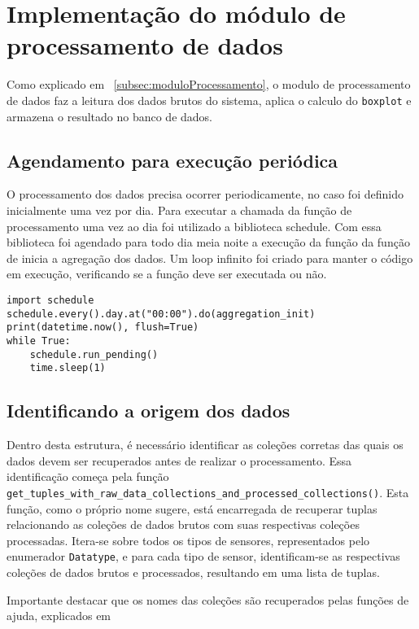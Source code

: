 \section[Implementação do módulo de processamento de dados]{Implementação do módulo de processamento de dados}

Como explicado em ~\ref{subsec:moduloProcessamento}, o modulo de processamento de dados faz a leitura dos dados brutos do sistema, aplica o calculo do \texttt{boxplot} e armazena o resultado no banco de dados.

\subsection{Agendamento para execução periódica}
O processamento dos dados precisa ocorrer periodicamente, no caso foi definido inicialmente uma vez por dia. Para executar a chamada da função de processamento uma vez ao dia foi utilizado a biblioteca schedule. Com essa biblioteca foi agendado para todo dia meia noite a execução da função da função de inicia a agregação dos dados. Um loop infinito foi criado para manter o código em execução, verificando se a função deve ser executada ou não.

\begin{verbatim}
import schedule
schedule.every().day.at("00:00").do(aggregation_init)
print(datetime.now(), flush=True)
while True:
    schedule.run_pending()
    time.sleep(1)
\end{verbatim}

\subsection{Identificando a origem dos dados}
Dentro desta estrutura, é necessário identificar as coleções corretas das quais os dados devem ser recuperados antes de realizar o processamento. Essa identificação começa pela função \texttt{get\_tuples\_with\_raw\_data\_collections\_and\_processed\_collections()}. Esta função, como o próprio nome sugere, está encarregada de recuperar tuplas relacionando as coleções de dados brutos com suas respectivas coleções processadas. Itera-se sobre todos os tipos de sensores, representados pelo enumerador \texttt{Datatype}, e para cada tipo de sensor, identificam-se as respectivas coleções de dados brutos e processados, resultando em uma lista de tuplas. 

Importante destacar que os nomes das coleções são recuperados pelas funções de ajuda, explicados em %

